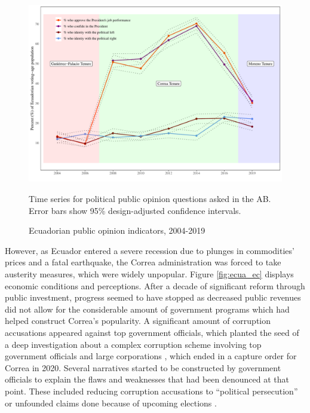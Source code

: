 \documentclass[12pt,a4]{article}
\makeatletter
\def\maxwidth{ %
  \ifdim\Gin@nat@width>\linewidth
    \linewidth
  \else
    \Gin@nat@width
  \fi
}
\newenvironment{knitrout}{}{} %
\makeatother
\begin{document}

\begin{figure}[htbp!]
\begin{knitrout}
\color{fgcolor}

{\centering \includegraphics[width=\maxwidth]{figure/political_graph-1} 

}


\end{knitrout}
\caption{Ecuadorian public opinion indicators, 2004-2019}
\label{fig:ecua_pol}
Time series for political public opinion questions asked in the AB. Error bars show 95\% design-adjusted confidence intervals.
\end{figure}

However, as Ecuador entered a severe recession due to plunges in commodities’ prices and a fatal earthquake, the Correa administration was forced to take austerity measures, which were widely unpopular. Figure \ref{fig:ecua_ec} displays economic conditions and perceptions. After a decade of significant reform through public investment, progress seemed to have stopped as decreased public revenues did not allow for the considerable amount of government programs which had helped construct Correa's popularity. A significant amount of corruption accusations appeared against top government officials, which planted the seed of a deep investigation about a complex corruption scheme involving top government officials and large corporations \parencite{Villavicencio.2019}, which ended in a capture order for Correa in 2020. Several narratives started to be constructed by government officials to explain the flaws and weaknesses that had been denounced at that point. These included reducing corruption accusations to \enquote{political persecution} or unfounded claims done because of upcoming elections \parencite{Melendez.2017}. 
\end{document}
